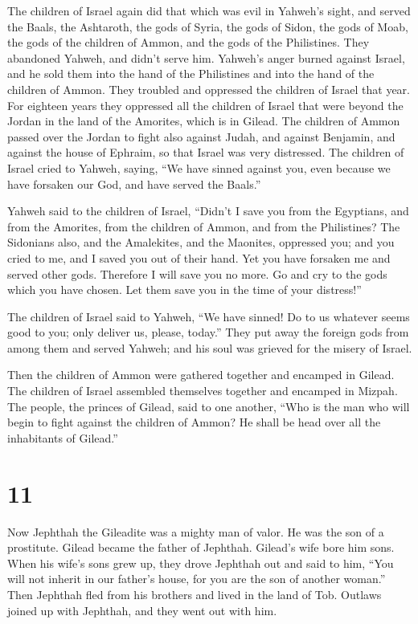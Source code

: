  The children of Israel again did that which was evil in
Yahweh's sight, and served the Baals, the Ashtaroth, the gods of Syria,
the gods of Sidon, the gods of Moab, the gods of the children of Ammon,
and the gods of the Philistines. They abandoned Yahweh, and didn't serve
him.  Yahweh's anger burned against Israel, and he sold them
into the hand of the Philistines and into the hand of the children of
Ammon.  They troubled and oppressed the children of Israel
that year. For eighteen years they oppressed all the children of Israel
that were beyond the Jordan in the land of the Amorites, which is in
Gilead.  The children of Ammon passed over the Jordan to
fight also against Judah, and against Benjamin, and against the house of
Ephraim, so that Israel was very distressed.  The children
of Israel cried to Yahweh, saying, ``We have sinned against you, even
because we have forsaken our God, and have served the Baals.''

 Yahweh said to the children of Israel, ``Didn't I save you
from the Egyptians, and from the Amorites, from the children of Ammon,
and from the Philistines?  The Sidonians also, and the
Amalekites, and the Maonites, oppressed you; and you cried to me, and I
saved you out of their hand.  Yet you have forsaken me and
served other gods. Therefore I will save you no more.  Go
and cry to the gods which you have chosen. Let them save you in the time
of your distress!''

 The children of Israel said to Yahweh, ``We have sinned!
Do to us whatever seems good to you; only deliver us, please, today.''
 They put away the foreign gods from among them and served
Yahweh; and his soul was grieved for the misery of Israel.

 Then the children of Ammon were gathered together and
encamped in Gilead. The children of Israel assembled themselves together
and encamped in Mizpah.  The people, the princes of Gilead,
said to one another, ``Who is the man who will begin to fight against
the children of Ammon? He shall be head over all the inhabitants of
Gilead.''

\hypertarget{section-10}{%
\section{11}\label{section-10}}

 Now Jephthah the Gileadite was a mighty man of valor. He
was the son of a prostitute. Gilead became the father of Jephthah.
 Gilead's wife bore him sons. When his wife's sons grew up,
they drove Jephthah out and said to him, ``You will not inherit in our
father's house, for you are the son of another woman.'' 
Then Jephthah fled from his brothers and lived in the land of Tob.
Outlaws joined up with Jephthah, and they went out with him.

